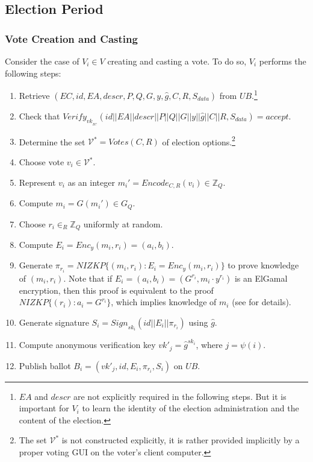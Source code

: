 \documentclass[bibtotoc,halfparskip,oneside]{scrreprt}
\newcommand{\eid}{\mathit{id}\xspace}
\newcommand{\descr}{\mathit{descr}\xspace}
\newcommand{\sk}[1]{\mathit{sk}_{#1}\xspace}
\newcommand{\vk}[1]{\mathit{vk}_{#1}\xspace}
\newcommand{\vkprime}[1]{\mathit{vk}'_{#1}\xspace}
\newcommand{\VK}[1]{\vk{_#1}\xspace}
\newcommand{\EA}{\ensuremath{\mathit{EA}}\xspace}
\newcommand{\EC}{\ensuremath{\mathit{EC}}\xspace}
\newcommand{\UB}{\ensuremath{\mathit{UB}}\xspace}
\newcommand{\Voter}[1]{\ensuremath{\mathit{V}_{#1}}\xspace}
\begin{document}
\subsection{Election Period}\label{election_period}



\subsubsection{Vote Creation and Casting}
Consider the case of $\Voter{i}\in V$ creating and casting a vote. To do so, $\Voter{i}$ performs the following steps:
\begin{enumerate}
	\item Retrieve $(\EC,\eid,\EA,\descr,P,Q,G,y,\hat{g},C,R,S_{data})$ from \UB.\footnote{$\EA$ and $\descr$ are not explicitly required in the following steps. But it is important for $\Voter{i}$ to learn the identity of the election administration and the content of the election.}
	\item Check that $\mathit{Verify}_{\VK{\EC}}(\eid||\EA||\descr||P||Q||G||y||\hat{g}||C||R,S_{data})=\mathit{accept}$.
	\item Determine the set $\mathcal{V}^*=\mathit{Votes}(C,R)$ of election options.\footnote{The set $\mathcal{V}^*$ is not constructed explicitly, it is rather provided implicitly by a proper voting GUI on the voter's client computer.}
	\item Choose vote $v_i\in \mathcal{V}^*$.
	\item Represent $v_i$ as an integer $m_i'=\mathit{Encode}_{C,R}(v_i) \in \mathbb{Z}_Q$.
	\item Compute $m_i=G(m_i') \in G_Q$.
	\item Choose $r_i\in_R\mathbb{Z}_Q$ uniformly at random.
	\item Compute $E_i=\mathit{Enc}_y(m_i,r_i)=(a_i,b_i)$.
	\item Generate $\pi_{r_i}=\mathit{NIZKP}\{(m_i,r_i):E_i=\mathit{Enc}_y(m_i,r_i)\}$ to prove knowledge of $(m_i,r_i)$. Note that if $E_i=(a_i,b_i)=(G^{r_i},m_i\cdot y^{r_i})$ is an ElGamal encryption, then this proof is equivalent to the proof $\mathit{NIZKP}\{(r_i):a_i=G^{r_i}\}$, which implies knowledge of $m_i$ (see  for details).
	\item Generate signature $S_i=\mathit{Sign}_{\sk{i}}(\eid||E_i||\pi_{r_i})$ using $\hat{g}$.
	\item Compute anonymous verification key $\vkprime{j}=\hat{g}^{\sk{i}}$, where $j=\psi(i)$.
	\item Publish ballot $B_i=(\vkprime{j},\eid,E_i,\pi_{r_i},S_i)$ on \UB.
\end{enumerate}
\end{document}
